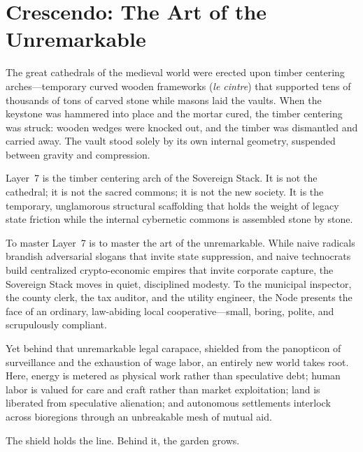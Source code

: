 \section{Crescendo: The Art of the Unremarkable}

The great cathedrals of the medieval world were erected upon timber centering arches—temporary curved wooden frameworks (\textit{le cintre}) that supported tens of thousands of tons of carved stone while masons laid the vaults. When the keystone was hammered into place and the mortar cured, the timber centering was struck: wooden wedges were knocked out, and the timber was dismantled and carried away. The vault stood solely by its own internal geometry, suspended between gravity and compression.

Layer~7 is the timber centering arch of the Sovereign Stack. It is not the cathedral; it is not the sacred commons; it is not the new society. It is the temporary, unglamorous structural scaffolding that holds the weight of legacy state friction while the internal cybernetic commons is assembled stone by stone.

To master Layer~7 is to master the art of the unremarkable. While naive radicals brandish adversarial slogans that invite state suppression, and naive technocrats build centralized crypto-economic empires that invite corporate capture, the Sovereign Stack moves in quiet, disciplined modesty. To the municipal inspector, the county clerk, the tax auditor, and the utility engineer, the Node presents the face of an ordinary, law-abiding local cooperative—small, boring, polite, and scrupulously compliant.

Yet behind that unremarkable legal carapace, shielded from the panopticon of surveillance and the exhaustion of wage labor, an entirely new world takes root. Here, energy is metered as physical work rather than speculative debt; human labor is valued for care and craft rather than market exploitation; land is liberated from speculative alienation; and autonomous settlements interlock across bioregions through an unbreakable mesh of mutual aid.

The shield holds the line. Behind it, the garden grows.
